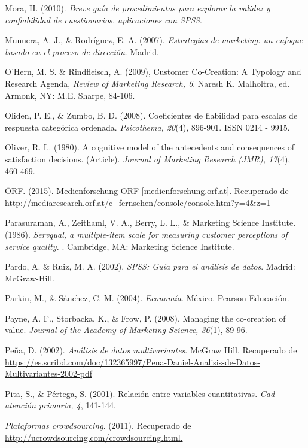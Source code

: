 \begin{thebibliography}{11}
	\bibitem{}
		Mora, H. (2010).  \emph{Breve guía de procedimientos para explorar la validez y confiabilidad de cuestionarios. aplicaciones con SPSS}.

	\bibitem{}
		Munuera, A. J., \& Rodríguez, E. A. (2007).  \emph{Estrategias de marketing: un enfoque basado en el proceso de dirección}. Madrid.

	\bibitem{}
		O’Hern, M. S. \& Rindfleisch, A. (2009), Customer Co-Creation: A Typology and Research Agenda, \emph{Review of Marketing Research, 6}. Naresh K. Malholtra, ed. Armonk, NY: M.E. Sharpe, 84-106.

	\bibitem{}
		Oliden, P. E., \& Zumbo, B. D. (2008). Coeficientes de fiabilidad para escalas de respuesta categórica ordenada.  \emph{Psicothema, 20}(4), 896-901. ISSN 0214 - 9915.

	\bibitem{}
		Oliver, R. L. (1980). A cognitive model of the antecedents and consequences of satisfaction decisions. (Article). \emph{Journal of Marketing Research (JMR), 17}(4), 460-469.

	\bibitem{}
		ÖRF. (2015). Medienforschung ORF [medienforschung.orf.at]. Recuperado de \url{http://mediaresearch.orf.at/c_fernsehen/console/console.htm?y=4&z=1}

	\bibitem{}
		Parasuraman, A., Zeithaml, V. A., Berry, L. L., \& Marketing Science Institute. (1986). \emph{Servqual, a multiple-item scale for measuring customer perceptions of service quality. }. Cambridge, MA: Marketing Science Institute. 

	\bibitem{}
		Pardo, A. \& Ruiz, M. A. (2002). \emph{SPSS: Guía para el análisis de datos}. Madrid: McGraw-Hill. 

	\bibitem{}
		Parkin, M., \& Sánchez, C. M. (2004). \emph{Economía}. México. Pearson Educación.

	\bibitem{}
		Payne, A. F., Storbacka, K., \& Frow, P. (2008). Managing the co-creation of value. \emph{Journal of the Academy of Marketing Science, 36}(1), 89-96.

	\bibitem{}
		Peña, D. (2002). \emph{Análisis de datos multivariantes}. McGraw Hill. Recuperado de \url{https://es.scribd.com/doc/132365997/Pena-Daniel-Analisis-de-Datos-Multivariantes-2002-pdf}

	\bibitem{}
		Pita, S., \& Pértega, S. (2001). Relación entre variables cuantitativas.  \emph{Cad atención primaria, 4}, 141-144.

	\bibitem{}
		\emph{Plataformas crowdsourcing}. (2011). Recuperado de \url{http://ucrowdsourcing.com/crowdsourcing.html. } 


\end{thebibliography}
